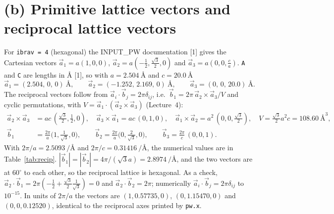 \documentclass[11pt,a4paper]{article}
\newcommand{\vb}[1]{\vec{#1}}
\begin{document}
\section*{(b) Primitive lattice vectors and reciprocal lattice vectors}
For \texttt{ibrav = 4} (hexagonal) the INPUT\_PW documentation [1] gives the Cartesian vectors
$\vb a_1=a(1,0,0)$, $\vb a_2=a(-\tfrac12,\tfrac{\sqrt3}{2},0)$ and $\vb a_3=a(0,0,\tfrac ca)$. \texttt{A} and
\texttt{C} are lengths in \si{\angstrom} [1], so with $a=\SI{2.504}{\angstrom}$ and $c=\SI{20.0}{\angstrom}$
\[
  \vb a_1=(2.504,\,0,\,0)~\si{\angstrom},\qquad
  \vb a_2=(-1.252,\,2.169,\,0)~\si{\angstrom},\qquad
  \vb a_3=(0,\,0,\,20.0)~\si{\angstrom}.
\]
The reciprocal vectors follow from $\vb a_i\cdot\vb b_j=2\pi\delta_{ij}$, i.e.\
$\vb b_1=2\pi\,\vb a_2\times\vb a_3/V$ and cyclic permutations, with $V=\vb a_1\cdot(\vb a_2\times\vb a_3)$ (Lecture~4):
\begin{align*}
  \vb a_2\times\vb a_3 &= ac\,(\tfrac{\sqrt3}{2},\tfrac12,0),\quad
  \vb a_3\times\vb a_1 = ac\,(0,1,0),\quad
  \vb a_1\times\vb a_2 = a^2\,(0,0,\tfrac{\sqrt3}{2}),\quad
  V=\tfrac{\sqrt3}{2}a^2c=\SI{108.60}{\angstrom\cubed},\\
  \vb b_1 &= \frac{2\pi}{a}\Big(1,\tfrac{1}{\sqrt3},0\Big),\qquad
  \vb b_2 = \frac{2\pi}{a}\Big(0,\tfrac{2}{\sqrt3},0\Big),\qquad
  \vb b_3 = \frac{2\pi}{c}\,(0,0,1).
\end{align*}
With $2\pi/a=\SI{2.5093}{\per\angstrom}$ and $2\pi/c=\SI{0.31416}{\per\angstrom}$, the numerical values are in
Table~\ref{tab:recip}. $|\vb b_1|=|\vb b_2|=4\pi/(\sqrt3a)=\SI{2.8974}{\per\angstrom}$, and the two vectors are at $60^\circ$
to each other, so the reciprocal lattice is hexagonal. As a check, $\vb a_2\cdot\vb b_1=2\pi(-\tfrac12+\tfrac{\sqrt3}{2}\tfrac{1}{\sqrt3})=0$
and $\vb a_2\cdot\vb b_2=2\pi$; numerically $\vb a_i\cdot\vb b_j=2\pi\delta_{ij}$ to $10^{-15}$. In units of
$2\pi/a$ the vectors are $(1,0.57735,0)$, $(0,1.15470,0)$ and $(0,0,0.12520)$, identical to the reciprocal axes printed by \texttt{pw.x}.
\end{document}
